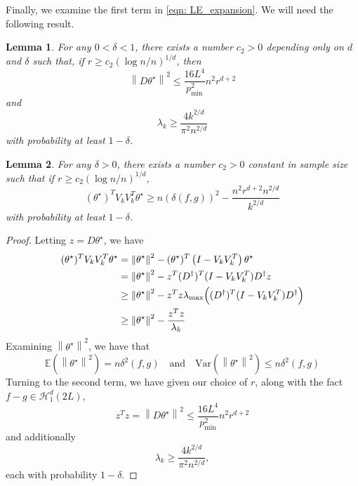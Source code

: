 \documentclass{article}
\newcommand{\norm}[1]{\left\lVert#1\right\rVert}
\newcommand{\Var}{\mathrm{Var}}
\newcommand{\1}{\mathbb{I}}
\newcommand{\thetast}{\theta^{\star}}
\newcommand{\Ebb}{\mathbb{E}}
\theoremstyle{alden}
\theoremstyle{aldenthm}
\newtheorem{lemma}{Lemma}
\theoremstyle{definition}
\theoremstyle{remark}
\begin{document}
Finally, we examine the first term in \eqref{eqn: LE_expansion}. We will need the following result.
\begin{lemma}
	For any $0 < \delta < 1$, there exists a number $c_2 > 0$ depending only on $d$ and $\delta$ such that, if $r \geq c_2(\log n/n)^{1/d}$, then
	\begin{equation*}
	\norm{D \thetast}^2 \leq \frac{16 L^4}{p_{\min}^2} n^2 r^{d + 2}
	\end{equation*}
	and
	\begin{equation*}
	\lambda_k \geq \frac{4 k^{2/d}}{\pi^2 n^{2/d}}
	\end{equation*}
	with probability at least $1 - \delta$.
\end{lemma}
\begin{lemma}
	\label{lem: approximation_error}
	For any $\delta > 0$, there exists a number $c_2 > 0$ constant in sample size such that if $r \geq c_2 (\log n / n)^{1/d}$,
	\begin{equation*}
	(\thetast)^T V_k V_k^T \thetast \geq n (\delta(f,g))^2 - \frac{n^2r^{d + 2} n^{2/d}}{k^{2/d}}
	\end{equation*}
	with probability at least $1 - \delta$.
\end{lemma}
\begin{proof}
	Letting $z = D \thetast$, we have
	\begin{align*}
	(\thetast)^T V_k V_k^T \thetast & = \norm{\thetast}^2 - (\thetast)^T \left(I - V_k V_k^T \right) \thetast \\
	& = \norm{\thetast}^2- z^T (D^{\dagger})^T (I - V_k V_k^T) D^{\dagger} z \\
	& \geq \norm{\thetast}^2 - z^T z \lambda_{\max} \Bigl((D^{\dagger})^T (I - V_k V_k^T) D^{\dagger} \Bigr) \\
	& \geq \norm{\thetast}^2 - \frac{z^T z}{\lambda_{k}}
	\end{align*}
	Examining $\norm{\thetast}^2$, we have that
	\begin{equation*}
	\Ebb(\norm{\thetast}^2) = n \delta^2(f,g) \quad \text{and} \quad \Var(\norm{\thetast}^2) \leq n \delta^2(f,g)
	\end{equation*}
	Turning to the second term, we have given our choice of $r$, along with the fact $f - g \in \mathcal{H}_1^{d}(2L)$,
	\begin{equation*}
	z^T z = \norm{D \thetast}^2 \leq \frac{16 L^4}{p_{\min}^2} n^2 r^{d + 2}
	\end{equation*}
	and additionally
	\begin{equation*}
	\lambda_k \geq \frac{4 k^{2/d}}{\pi^2 n^{2/d}},
	\end{equation*}
	each with probability $1 - \delta$.
\end{proof}
\end{document}
